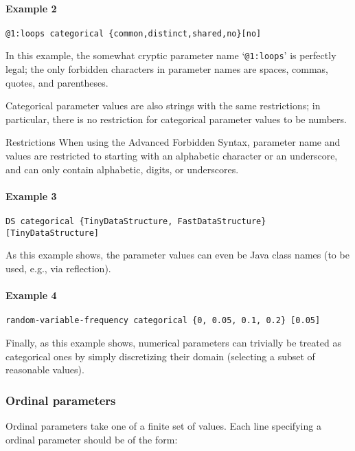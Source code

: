\documentclass[manual.tex]{subfiles}
\begin{document}
\paragraph{Example 2}
\begin{verbatim}
@1:loops categorical {common,distinct,shared,no}[no]
\end{verbatim}
In this example, the somewhat cryptic parameter name `\texttt{@1:loops}' is perfectly legal; the only forbidden characters in parameter names are spaces, commas, quotes, and parentheses. 

%
Categorical parameter values are also strings with the same restrictions; in particular, there is no restriction for categorical parameter values to be numbers. 

\begin{bclogo}[logo=\bcattention, couleurBarre=red, noborder=true]{Restrictions}
When using the Advanced Forbidden Syntax, parameter name and values are restricted to starting with an alphabetic character or an underscore, and can only contain alphabetic, digits, or underscores.
\end{bclogo}

\paragraph{Example 3}
\begin{verbatim}
DS categorical {TinyDataStructure, FastDataStructure}[TinyDataStructure]
\end{verbatim}
As this example shows, the parameter values can even be Java class names (to be used, e.g., via reflection).

\paragraph{Example 4}
\begin{verbatim}
random-variable-frequency categorical {0, 0.05, 0.1, 0.2} [0.05]
\end{verbatim}
Finally, as this example shows, numerical parameters can trivially be treated as categorical ones by simply discretizing their domain (selecting a subset of reasonable values).

\subsubsection*{Ordinal parameters} \label{sec:ordinal-params}
Ordinal parameters take one of a finite set of values. Each line specifying a ordinal parameter should be of the form:
\end{document}

